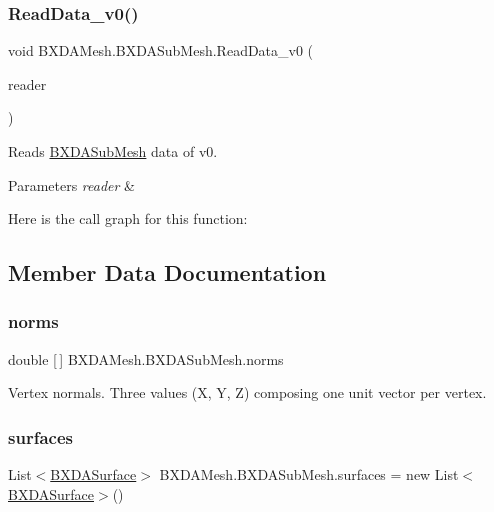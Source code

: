 \subsubsection{\texorpdfstring{Read\+Data\+\_\+v0()}{ReadData\_v0()}}
{\footnotesize\ttfamily void B\+X\+D\+A\+Mesh.\+B\+X\+D\+A\+Sub\+Mesh.\+Read\+Data\+\_\+v0 (\begin{DoxyParamCaption}\item[{Binary\+Reader}]{reader }\end{DoxyParamCaption})}



Reads \hyperlink{class_b_x_d_a_mesh_1_1_b_x_d_a_sub_mesh}{B\+X\+D\+A\+Sub\+Mesh} data of v0. 


\begin{DoxyParams}{Parameters}
{\em reader} & \\
\hline
\end{DoxyParams}
Here is the call graph for this function\+:


\subsection{Member Data Documentation}
\mbox{\label{class_b_x_d_a_mesh_1_1_b_x_d_a_sub_mesh_a098a0a069e7ed3e32caf3ca6bbfd752a}} 
\subsubsection{\texorpdfstring{norms}{norms}}
{\footnotesize\ttfamily double \mbox{[}$\,$\mbox{]} B\+X\+D\+A\+Mesh.\+B\+X\+D\+A\+Sub\+Mesh.\+norms}



Vertex normals. Three values (X, Y, Z) composing one unit vector per vertex. 

\mbox{\label{class_b_x_d_a_mesh_1_1_b_x_d_a_sub_mesh_a6b55f3c3beb64270a075b12cfa45143c}} 
\subsubsection{\texorpdfstring{surfaces}{surfaces}}
{\footnotesize\ttfamily List$<$\hyperlink{class_b_x_d_a_mesh_1_1_b_x_d_a_surface}{B\+X\+D\+A\+Surface}$>$ B\+X\+D\+A\+Mesh.\+B\+X\+D\+A\+Sub\+Mesh.\+surfaces = new List$<$\hyperlink{class_b_x_d_a_mesh_1_1_b_x_d_a_surface}{B\+X\+D\+A\+Surface}$>$()}



